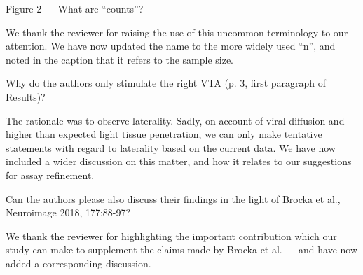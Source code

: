 \begin{point}
	Figure 2 --- What are “counts”?
\end{point}
\begin{reply}
	We thank the reviewer for raising the use of this uncommon terminology to our attention.
	We have now updated the name to the more widely used “n”, and noted in the caption that it refers to the sample size.
\end{reply}

\begin{point}
	Why do the authors only stimulate the right VTA (p. 3, first paragraph of Results)?
\end{point}
\begin{reply}
	The rationale was to observe laterality.
	Sadly, on account of viral diffusion and higher than expected light tissue penetration, we can only make tentative statements with regard to laterality based on the current data.
	We have now included a wider discussion on this matter, and how it relates to our suggestions for assay refinement.
\end{reply}

\begin{point}
	Can the authors please also discuss their findings in the light of Brocka et al., Neuroimage 2018, 177:88-97?
\end{point}
\begin{reply}
	We thank the reviewer for highlighting the important contribution which our study can make to supplement the claims made by Brocka et al. --- and have now added a corresponding discussion.
\end{reply}
